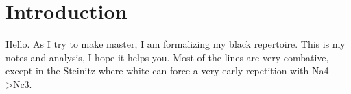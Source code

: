 \documentclass{article}
\begin{document}
\tableofcontents






\section{Introduction}
Hello. As I try to make master, I am formalizing my black repertoire.
This is my notes and analysis, I hope it helps you.
Most of the lines are very combative, except in the Steinitz where white can 
force a very early repetition with Na4->Nc3.
\end{document}

